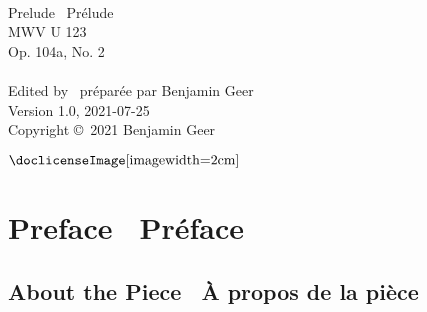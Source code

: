 \documentclass[a4paper, 12pt]{book}
\newcommand{\bigdot}[0]{{\Large \textbullet}}
\begin{document}
\frontmatter


\begin{titlepage}
\begin{center}
   \\
  \vspace{2cm}
  {\fontsize{32}{42}\selectfont Prelude \textbullet\ \foreignlanguage{french}{Prélude}} \\
  \vspace{2 cm}
  {\fontsize{24}{34}\selectfont MWV U 123} \\
  \vspace{0.5 cm}
  {\fontsize{24}{34}\selectfont Op. 104a, No. 2} \\
  \vspace{4.6 cm}
  {\Large {}} \\
  \vspace{0.5 cm}
  {\Large Edited by \textbullet\ \foreignlanguage{french}{préparée par} Benjamin Geer} \\
  \vspace{4.6 cm}
  {\footnotesize Version 1.0, 2021-07-25} \\
  \vspace{0.1 cm}
  {\footnotesize Copyright \copyright\ 2021 Benjamin Geer} \\
  \vspace{0.25 cm}
  \begin{minipage}{\textwidth}
  \centering
  $\vcenter{\hbox{\doclicenseImage[imagewidth=2cm]}}$
  \end{minipage}
  \end{center}
\end{titlepage}


\chapter*{Preface \bigdot\ \foreignlanguage{french}{Préface}}

\section*{About the Piece \bigdot\ \foreignlanguage{french}{À propos de la pièce}}
\end{document}
